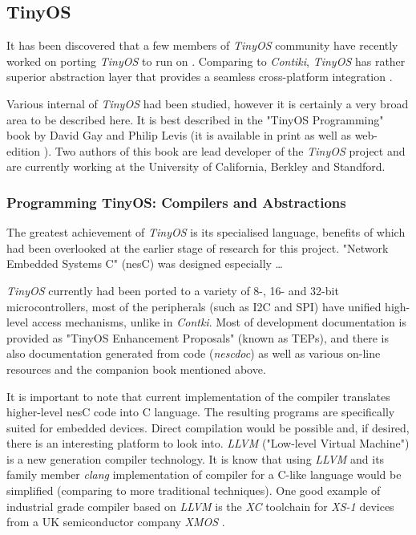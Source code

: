 {{\subsection{TinyOS}

  It has been discovered that a few members of \emph{TinyOS} community
 have recently worked on porting \emph{TinyOS} to run on 
 \cite{tinyos:arch:rfa1-p1,tinyos:arch:rfa1-p2}. Comparing to \emph{Contiki},
 \emph{TinyOS} has rather superior abstraction layer that provides a seamless 
 cross-platform integration \cite{tinyos:tepXXX,tinyos:tepYYY,tinyos:tepZZZ}.
 
  Various internal of \emph{TinyOS} had been studied, however it is
 certainly a very broad area to be described here. It is best described
 in the "TinyOS Programming" book by David Gay and Philip Levis (it is
 available in print as well as web-edition \cite{tinyos:book}). Two
 authors of this book are lead developer of the \emph{TinyOS} project
 and are currently working at the University of California, Berkley
 and Standford.

\subsubsection{Programming TinyOS: Compilers and Abstractions}

  The greatest achievement of \emph{TinyOS} is its specialised language,
 benefits of which had been overlooked at the earlier stage of research
 for this project. "Network Embedded Systems C" (nesC) was designed
 especially \dots

 \emph{TinyOS} currently had been ported to a variety of 8-, 16- and
 32-bit microcontrollers, most of the peripherals (such as I2C and SPI)
 have unified high-level access mechanisms, unlike in \emph{Contki}.
 Most of development documentation is provided as "TinyOS Enhancement
 Proposals" (known as TEPs), and there is also documentation generated
 from code (\emph{nescdoc}) as well as various on-line resources and
 the companion book mentioned above. %

 It is important to note that current implementation of the compiler
 translates higher-level nesC code into C language. The resulting
 programs are specifically suited for embedded devices. Direct
 compilation would be possible and, if desired, there is an interesting
 platform to look into. \emph{LLVM} ("Low-level Virtual Machine") is a
 new generation compiler technology. It is know that using \emph{LLVM}
 and its family member \emph{clang} implementation of compiler for
 a C-like language would be simplified (comparing to more traditional
 techniques). One good example of industrial grade compiler based on
 \emph{LLVM} is the \emph{XC} toolchain for \emph{XS-1} devices from
 a UK semiconductor company \emph{XMOS} \cite{paper:xmos:docs:xcc}.

}}
